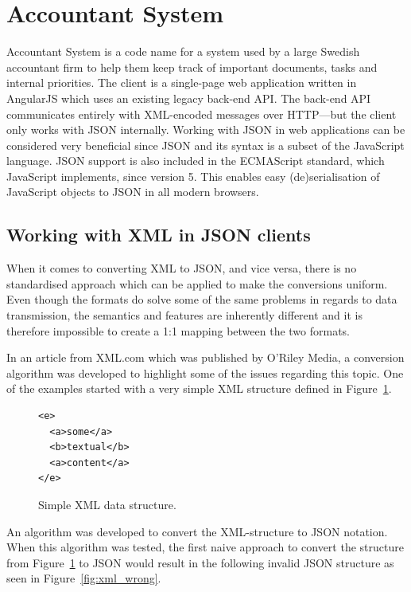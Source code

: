 \documentclass{cslthse-msc}
\begin{document}
\section{Accountant System}

Accountant System is a code name for a system used by a large Swedish accountant firm to help them keep track of important documents, tasks and internal priorities. The client is a single-page web application written in AngularJS which uses an existing legacy back-end API. The back-end API communicates entirely with XML-encoded messages over HTTP---but the client only works with JSON internally. Working with JSON in web applications can be considered very beneficial since JSON and its syntax is a subset of the JavaScript language. JSON support is also included in the ECMAScript standard, which JavaScript implements, since version 5\cite{ecmascript_5}. This enables easy (de)serialisation of JavaScript objects to JSON in all modern browsers.

\subsection{Working with XML in JSON clients}
\label{xml_json}

When it comes to converting XML to JSON, and vice versa, there is no standardised approach which can be applied to make the conversions uniform. Even though the formats do solve some of the same problems in regards to data transmission, the semantics and features are inherently different and it is therefore impossible to create a 1:1 mapping between the two formats.

In an article from XML.com\cite{xml_json} which was published by O'Riley Media, a conversion algorithm was developed to highlight some of the issues regarding this topic. One of the examples started with a very simple XML structure defined in Figure~\ref{fig:xml_structure}.

\begin{figure}[H]
  \centering
    \begin{center}
\begin{lstlisting}[breaklines=true,frame=single]
<e>
  <a>some</a>
  <b>textual</b>
  <a>content</a>
</e>
\end{lstlisting}
    \end{center}
  \caption{Simple XML data structure.}
  \label{fig:xml_structure}
\end{figure}

An algorithm was developed to convert the XML-structure to JSON notation. When this algorithm was tested, the first naive approach to convert the structure from Figure~\ref{fig:xml_structure} to JSON would result in the following invalid JSON structure as seen in Figure~\ref{fig:xml_wrong}.
\end{document}
